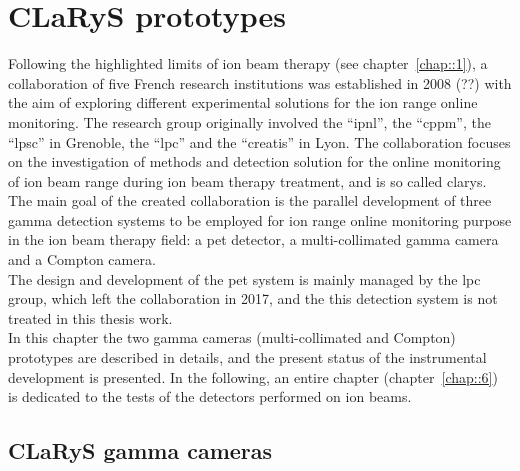 \chapter{CLaRyS prototypes}\label{chap::3}


\vfill

\minitoc

\newpage


Following the highlighted limits of ion beam therapy (see chapter~\ref{chap::1}), a collaboration of five French research institutions was established in 2008 (??) with the aim of exploring different experimental solutions for the ion range online monitoring. The research group originally involved the \enquote{\gls{ipnl}}, the \enquote{\gls{cppm}}, the \enquote{\gls{lpsc}} in Grenoble, the \enquote{\gls{lpc}} and the \enquote{\gls{creatis}} in Lyon. The collaboration focuses on the investigation of methods and detection solution for the online monitoring of ion beam range during ion beam therapy treatment, and is so called \gls{clarys}.\\
The main goal of the created collaboration is the parallel development of three gamma detection systems to be employed for ion range online monitoring purpose in the ion beam therapy field: a \gls{pet} detector, a multi-collimated gamma camera and a Compton camera.\\ The design and development of the \gls{pet} system is mainly managed by the \gls{lpc} group, which left the collaboration in 2017, and the this detection system is not treated in this thesis work.\\ 
In this chapter the two gamma cameras (multi-collimated and Compton) prototypes are described in details, and the present status of the instrumental development is presented. In the following, an entire chapter (chapter~\ref{chap::6}) is dedicated to the tests of the detectors performed on ion beams. 

\section{CLaRyS gamma cameras}\label{chap3::sec::CLaRyScameras}

